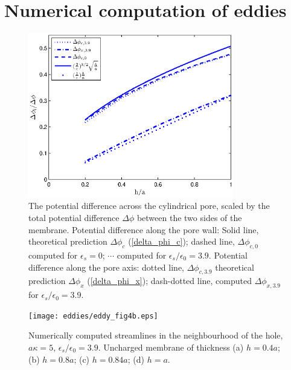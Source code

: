 \section{Numerical computation of eddies \label{numerical_comp}}


\begin{figure}[ht]
\centering
\includegraphics[width=0.8\textwidth,clip=true]{eddies/DeltaV_At_Corner_and_Axis2.eps}
\caption{The potential difference across the cylindrical pore, scaled by the
total potential difference $\Delta\phi$ between the two sides of the
membrane. Potential difference along the pore wall:
Solid line, theoretical prediction
$\Delta\phi_c$
(\ref{delta_phi_c});
dashed line, $\Delta\phi_{c,0}$ computed for $\epsilon_s=0$;
$\cdots$ 
computed for $\epsilon_s/\epsilon_0=3.9$.
Potential difference along the pore axis:
dotted line, $\Delta\phi_{c,3.9}$ 
theoretical prediction $\Delta\phi_x$ (\ref{delta_phi_x});
dash-dotted line, computed $\Delta\phi_{x,3.9}$ for $\epsilon_s/\epsilon_0=3.9$.
\label{fig:DeltaV}}
\end{figure}


\begin{figure}[ht]
\centering
\texttt{[image: eddies/eddy\_fig4b.eps]}
\caption{Numerically computed streamlines in the neighbourhood of the hole,
$a\kappa=5$, $\epsilon_s/\epsilon_0=3.9$. Uncharged membrane of thickness
(a) $h=0.4a$;
(b) $h=0.8a$;
(c) $h=0.84a$;
(d) $h=a$.
\label{fig:eddies}}
\end{figure}

